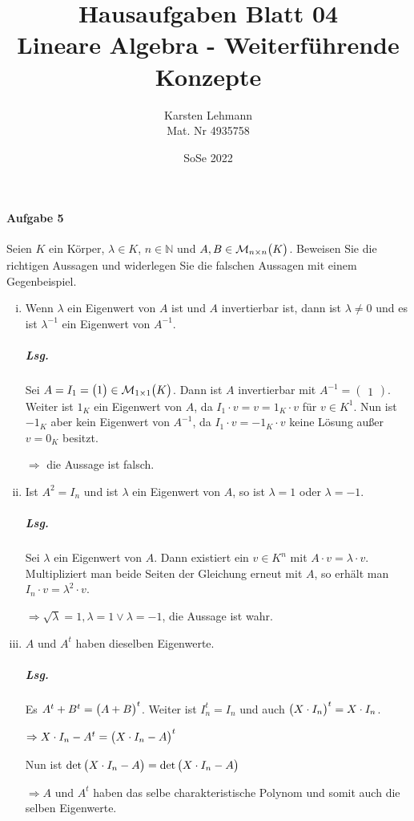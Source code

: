 \documentclass{scrreprt}
\author{Karsten Lehmann\\Mat. Nr 4935758}
\date{SoSe 2022}
\title{Hausaufgaben Blatt 04\\Lineare Algebra - Weiterführende Konzepte}
\begin{document}
\paragraph{Aufgabe 5} Seien $K$ ein Körper, $\lambda \in K$, $n \in \mathbb{N}$
und $A, B \in \mathcal{M}_{n \times n}\qty\big(K)$.
Beweisen Sie die richtigen Aussagen und widerlegen Sie die falschen Aussagen mit
einem Gegenbeispiel.

\begin{enumerate}[(i)]
\item Wenn $\lambda$ ein Eigenwert von $A$ ist und $A$ invertierbar ist, dann ist
  $\lambda \ne 0$ und es ist $\lambda^{-1}$ ein Eigenwert von $A^{-1}$.

  \subparagraph{Lsg.} Sei
  $A = I_1 = \begin{pmatrix}1\end{pmatrix} \in \mathcal{M}_{1 \times 1}\qty\big(K)$.
  Dann ist $A$ invertierbar mit $A^{-1} = \begin{pmatrix}1\end{pmatrix}$.
  Weiter ist $1_K$ ein Eigenwert von $A$, da $I_1 \cdot v = v = 1_K \cdot v$
  für $v \in K^1$.
  Nun ist $-1_K$ aber kein Eigenwert von $A^{-1}$, da $I_1 \cdot v = -1_K \cdot v$
  keine Lösung außer $v = 0_K$ besitzt.

  $\Rightarrow$ die Aussage ist falsch.

\item Ist $A^2 = I_n$ und ist $\lambda$ ein Eigenwert von $A$, so ist
  $\lambda = 1$ oder $\lambda = -1$.

  \subparagraph{Lsg.} Sei $\lambda$ ein Eigenwert von $A$.
  Dann existiert ein $v \in K^n$ mit $A \cdot v = \lambda \cdot v$.
  Multipliziert man beide Seiten der Gleichung erneut mit $A$, so
  erhält man $I_n \cdot v = \lambda^2 \cdot v$.

  $\Rightarrow \sqrt{\lambda} = 1, \lambda = 1 \lor \lambda = -1$,
  die Aussage ist wahr.

\item $A$ und $A^t$ haben dieselben Eigenwerte.

  \subparagraph{Lsg.} Es $A^t + B^t = \qty\big(A + B)^t$.
  Weiter ist $I_n^t = I_n$ und auch $\qty\big(X \cdot I_n)^t = X \cdot I_n$.

  $\Rightarrow X \cdot I_n - A^t = \qty\big(X \cdot I_n - A)^t$

  Nun ist $\det\qty\big(X \cdot I_n - A) = \det\qty\big(X \cdot I_n - A)$

  $\Rightarrow A$ und $A^t$ haben das selbe charakteristische Polynom und
  somit auch die selben Eigenwerte.


\end{enumerate}
\end{document}
